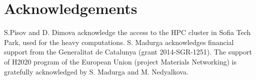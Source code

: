 \section{Acknowledgements}
S.Pisov and D. Dimova acknowledge the access to the HPC cluster in Sofia Tech Park, used for the heavy computations. S. Madurga acknowledges financial support from the Generalitat de Catalunya (grant 2014-SGR-1251). The support of H2020 program of the European Union (project Materials Networking) is gratefully acknowledged by S. Madurga and M. Nedyalkova.